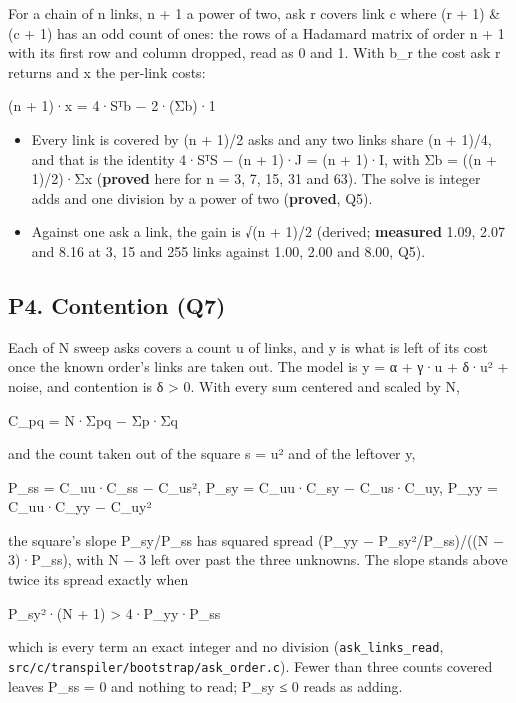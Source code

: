 For a chain of n links, n + 1 a power of two, ask r covers link c where (r + 1) \& (c + 1) has an odd count of ones: the rows of a Hadamard matrix of order n + 1 with its first row and column dropped, read as 0 and 1. With b\_\allowbreak{}r the cost ask r returns and x the per-link costs:

(n + 1)·x = 4·Sᵀb − 2·(Σb)·1

\begin{itemize}
\item Every link is covered by (n + 1)/2 asks and any two links share (n + 1)/4, and that is the identity 4·SᵀS − (n + 1)·J = (n + 1)·I, with Σb = ((n + 1)/2)·Σx (\textbf{proved} here for n = 3, 7, 15, 31 and 63). The solve is integer adds and one division by a power of two (\textbf{proved}, Q5).
\item Against one ask a link, the gain is √(n + 1)/2 (derived; \textbf{measured} 1.09, 2.07 and 8.16 at 3, 15 and 255 links against 1.00, 2.00 and 8.00, Q5).
\end{itemize}

\subsection{\texorpdfstring{P4. Contention (Q7)}{P4. Contention (Q7)}}

Each of N sweep asks covers a count u of links, and y is what is left of its cost once the known order's links are taken out. The model is y = α + γ·u + δ·u² + noise, and contention is δ > 0. With every sum centered and scaled by N,

C\_\allowbreak{}pq = N·Σpq − Σp·Σq

and the count taken out of the square s = u² and of the leftover y,

P\_\allowbreak{}ss = C\_\allowbreak{}uu·C\_\allowbreak{}ss − C\_\allowbreak{}us²,  P\_\allowbreak{}sy = C\_\allowbreak{}uu·C\_\allowbreak{}sy − C\_\allowbreak{}us·C\_\allowbreak{}uy,  P\_\allowbreak{}yy = C\_\allowbreak{}uu·C\_\allowbreak{}yy − C\_\allowbreak{}uy²

the square's slope P\_\allowbreak{}sy/P\_\allowbreak{}ss has squared spread (P\_\allowbreak{}yy − P\_\allowbreak{}sy²/P\_\allowbreak{}ss)/((N − 3)·P\_\allowbreak{}ss), with N − 3 left over past the three unknowns. The slope stands above twice its spread exactly when

P\_\allowbreak{}sy²·(N + 1) > 4·P\_\allowbreak{}yy·P\_\allowbreak{}ss

which is every term an exact integer and no division (\texttt{ask\_\allowbreak{}links\_\allowbreak{}read}, \texttt{src/\allowbreak{}c/\allowbreak{}transpiler/\allowbreak{}bootstrap/\allowbreak{}ask\_\allowbreak{}order.\allowbreak{}c}). Fewer than three counts covered leaves P\_\allowbreak{}ss = 0 and nothing to read; P\_\allowbreak{}sy ≤ 0 reads as adding.

